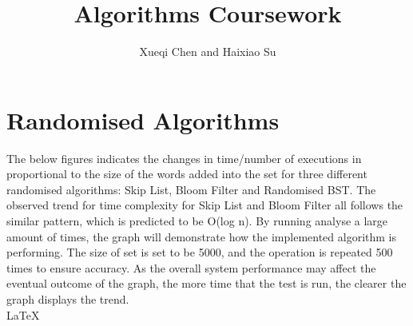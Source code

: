 \documentclass[11pt]{article}
\begin{document}
\title{Algorithms Coursework}
\author{Xueqi Chen and Haixiao Su}

\maketitle
\section*{Randomised Algorithms}
The below figures indicates the changes in time/number of executions in proportional to the size of the words added into the set for three different randomised algorithms: Skip List, Bloom Filter and Randomised BST. The observed trend for time complexity for Skip List and Bloom Filter all follows the similar pattern, which is predicted to be O(log n).
By running analyse a large amount of times, the graph will demonstrate how the implemented algorithm is performing. The size of set is set to be 5000, and the operation is repeated 500 times to ensure accuracy. As the overall system performance may affect the eventual outcome of the graph, the more time that the test is run, the clearer the graph displays the trend. \\
\LaTeX
\end{document}
